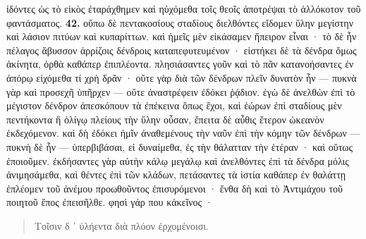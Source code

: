 \documentclass[a4paper, 11pt, oneside, polutonikogreek, german]{article}
\begin{document}
ἰδόντες ὡς τὸ εἰκὸς ἐταράχθημεν καὶ ηὐχόμεθα τοῖς θεοῖς ἀποτρέψαι τὸ ἀλλόκοτον τοῦ φαντάσματος. \textbf{42.} οὔπω δὲ πεντακοσίους σταδίους διελθόντες εἴδομεν ὕλην μεγίστην καὶ λάσιον πιτύων καὶ κυπαρίττων. καὶ ἡμεῖς μὲν εἰκάσαμεν ἤπειρον εἶναι · τὸ δὲ ἦν πέλαγος ἄβυσσον ἀρρίζοις δένδροις καταπεφυτευμένον · εἱστήκει δὲ τὰ δένδρα ὅμως ἀκίνητα, ὀρθὰ καθάπερ ἐπιπλέοντα. πλησιάσαντες γοῦν καὶ τὸ πᾶν κατανοήσαντες ἐν ἀπόρῳ εἰχόμεθα τί χρὴ δρᾶν · οὔτε γὰρ διὰ τῶν δένδρων πλεῖν δυνατὸν ἦν --- πυκνὰ γὰρ καὶ προσεχῆ ὑπῆρχεν --- οὔτε ἀναστρέφειν ἐδόκει ῥᾴδιον. ἐγὼ δὲ ἀνελθὼν ἐπὶ τὸ μέγιστον δένδρον ἀπεσκόπουν τὰ ἐπέκεινα ὅπως ἔχοι, καὶ ἑώρων ἐπὶ σταδίους μὲν πεντήκοντα ἢ ὀλίγῳ πλείους τὴν ὕλην οὖσαν, ἔπειτα δὲ αὖθις ἕτερον ὠκεανὸν ἐκδεχόμενον. καὶ δὴ ἐδόκει ἡμῖν ἀναθεμένους τὴν ναῦν ἐπὶ τὴν κόμην τῶν δένδρων --- πυκνὴ δὲ ἦν --- ὑπερβιβάσαι, εἰ δυναίμεθα, ἐς τὴν θάλατταν τὴν ἑτέραν · καὶ οὕτως ἐποιοῦμεν. ἐκδήσαντες γὰρ αὐτὴν κάλῳ μεγάλῳ καὶ ἀνελθόντες ἐπὶ τὰ δένδρα μόλις ἀνιμησάμεθα, καὶ θέντες ἐπὶ τῶν κλάδων, πετάσαντες τὰ ἱστία καθάπερ ἐν θαλάττῃ ἐπλέομεν τοῦ ἀνέμου προωθοῦντος ἐπισυρόμενοι · ἔνθα δὴ καὶ τὸ Ἀντιμάχου τοῦ ποιητοῦ ἔπος ἐπεισῆλθε. φησὶ γάρ που κἀκεῖνος ·
\begin{quotation}
\small
Τοῖσιν δ ᾽ ὑλήεντα διὰ πλόον ἐρχομένοισι.
\end{quotation}
\end{document}

